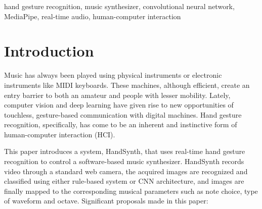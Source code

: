 \documentclass[conference]{IEEEtran}
\begin{document}
\begin{abstract}
This paper will introduce HandSynth, a real time hand controlled music synthesizer, which allows a user to play musical notes and to control sound parameters with using natural hand gestures, which are captured by a regular web camera. The system is deployed with two methods, one being Google Mediapipe Library to detect gestures based on a set of rules and the other being a Convolutional Neural Network (CNN) being trained on a personally generated dataset. The gestures are recognized and mapped to a pentatonic scale, the right hand taps the melody notes C, D, E, G, A and the left hand is also in charge of selecting the type and octave of the waveform with four possible options: Low, Mid, High, Sqr, Saw. NumPy generated waveforms (sine, square and sawtooth) are played through a continuous audio stream to synthesize audio in real time. The graphical user interface is developed using the PyQt6 and allows real-time web camera feedback, gesture activation and synthesizer. Experimental evidence shows the CNN model is capable of obtaining high classification accuracy over six gesture categories (0--5 fingers) with inference latency of less than 5 ms when quantized to TensorFlow Lite, and can be easily scaled into real-time with a 30 fps performance on a consumer-grade platform.
\end{abstract}

\begin{IEEEkeywords}
hand gesture recognition, music synthesizer, convolutional neural network, MediaPipe, real-time audio, human-computer interaction
\end{IEEEkeywords}

\section{Introduction}

Music has always been played using physical instruments or electronic instruments like MIDI keyboards. These machines, although efficient, create an entry barrier to both an amateur and people with lesser mobility. Lately, computer vision and deep learning have given rise to new opportunities of touchless, gesture-based communication with digital machines. Hand gesture recognition, specifically, has come to be an inherent and instinctive form of human-computer interaction (HCI).

This paper introduces a system, HandSynth, that uses real-time hand gesture recognition to control a software-based music synthesizer. HandSynth records video through a standard web camera, the acquired images are recognized and classified using either rule-based system or CNN architecture, and images are finally mapped to the corresponding musical parameters such as note choice, type of waveform and octave. Significant proposals made in this paper:
\end{document}
